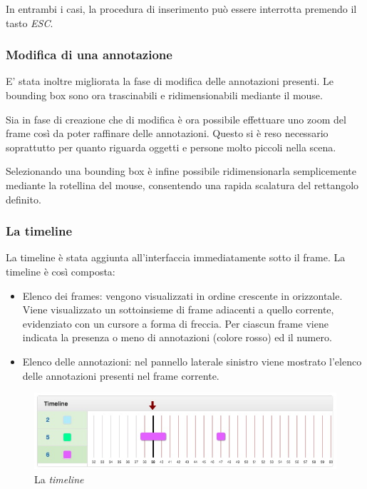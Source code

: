 In entrambi i casi, la procedura di inserimento può essere interrotta premendo il tasto \emph{ESC}.

\subsubsection{Modifica di una annotazione}

E' stata inoltre migliorata la fase di modifica delle annotazioni presenti. Le bounding box sono ora trascinabili e ridimensionabili mediante il mouse. 

Sia in fase di creazione che di modifica è ora possibile effettuare uno zoom del frame così da poter raffinare delle annotazioni. Questo si è reso necessario soprattutto per quanto riguarda oggetti e persone molto piccoli nella scena. 

Selezionando una bounding box è infine possibile ridimensionarla semplicemente mediante la rotellina del mouse, consentendo una rapida scalatura del rettangolo definito.

\subsubsection{La timeline}

La timeline è stata aggiunta all'interfaccia immediatamente sotto il frame. La timeline è così composta:
\begin{itemize}
\item Elenco dei frames: vengono visualizzati in ordine crescente in orizzontale. Viene visualizzato un sottoinsieme di frame adiacenti a quello corrente, evidenziato con un cursore a forma di freccia. Per ciascun frame viene indicata la presenza o meno di annotazioni (colore rosso) ed il numero.
\item Elenco delle annotazioni: nel pannello laterale sinistro viene mostrato l'elenco delle annotazioni presenti nel frame corrente.
\end{itemize}

\begin{figure}[h]
\centering
\includegraphics[width=1\linewidth]{images/timeline.jpg}
  \caption{La \emph{timeline}}
  \label{fig:timeline}
\end{figure}

